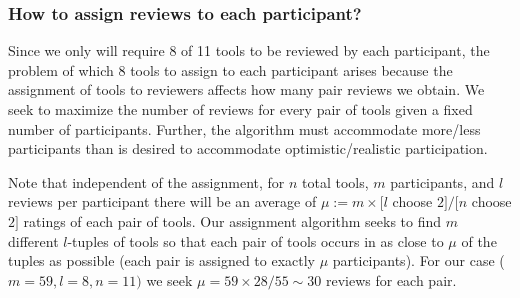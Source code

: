 \subsubsection{How to assign reviews to each participant?} 
Since we only will require 8 of 11 tools to be reviewed by each participant, the problem of which 8 tools to assign to each participant arises because the assignment of tools to reviewers affects how many pair reviews we obtain. 
We seek to maximize the number of reviews for every pair of tools given a fixed number of participants. 
Further, the algorithm must accommodate more/less participants than is desired to accommodate optimistic/realistic participation. 

Note that independent of the assignment, for $n$ total tools, $m$ participants, and $l$ reviews per participant there will be an average of $\mu := m \times [l$ choose $2]/[n$ choose $2]$ ratings of each pair of tools. 
Our assignment algorithm seeks to find $m$ different $l$-tuples of tools so that
each pair of tools occurs in as close to $\mu$ of the tuples as possible (each pair is assigned to exactly $\mu$ participants). 
For our case ($m = 59, l = 8, n = 11)$ we seek $\mu = 59 \times 28/55 \sim 30$ reviews for each pair. 

